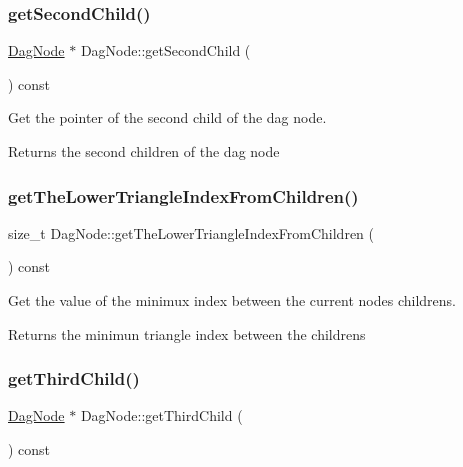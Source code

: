 \subsubsection{\texorpdfstring{get\+Second\+Child()}{getSecondChild()}}
{\footnotesize\ttfamily \hyperlink{classDagNode}{Dag\+Node} $\ast$ Dag\+Node\+::get\+Second\+Child (\begin{DoxyParamCaption}{ }\end{DoxyParamCaption}) const\hspace{0.3cm}{\ttfamily [inline]}}



Get the pointer of the second child of the dag node. 

\begin{DoxyReturn}{Returns}
the second children of the dag node 
\end{DoxyReturn}
\mbox{\label{classDagNode_a218a3940da0ecb136be52c7871251540}} 
\subsubsection{\texorpdfstring{get\+The\+Lower\+Triangle\+Index\+From\+Children()}{getTheLowerTriangleIndexFromChildren()}}
{\footnotesize\ttfamily size\+\_\+t Dag\+Node\+::get\+The\+Lower\+Triangle\+Index\+From\+Children (\begin{DoxyParamCaption}{ }\end{DoxyParamCaption}) const\hspace{0.3cm}{\ttfamily [inline]}}



Get the value of the minimux index between the current node\textquotesingle{}s childrens. 

\begin{DoxyReturn}{Returns}
the minimun triangle index between the childrens 
\end{DoxyReturn}
\mbox{\label{classDagNode_a6a7af1fc33b66e3a22ebcf1b7da4f482}} 
\subsubsection{\texorpdfstring{get\+Third\+Child()}{getThirdChild()}}
{\footnotesize\ttfamily \hyperlink{classDagNode}{Dag\+Node} $\ast$ Dag\+Node\+::get\+Third\+Child (\begin{DoxyParamCaption}{ }\end{DoxyParamCaption}) const\hspace{0.3cm}{\ttfamily [inline]}}



